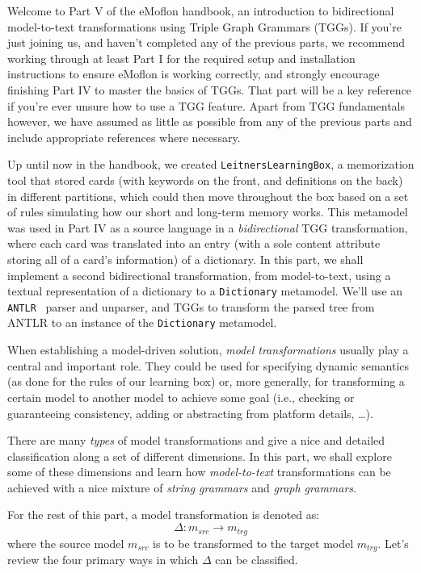 \genHeader

Welcome to Part V of the eMoflon handbook, an introduction to bidirectional model-to-text transformations using Triple Graph Grammars (TGGs). If you're just
joining us, and haven't completed any of the previous parts, we recommend working through at least Part I for the required setup and installation instructions
to ensure eMoflon is working correctly, and strongly encourage finishing Part IV to master the basics of TGGs. That part will be a key reference if you're ever
unsure how to use a TGG feature. Apart from TGG fundamentals however, we have assumed as little as possible from any of the previous parts and
include appropriate references where necessary.

Up until now in the handbook, we created \texttt{LeitnersLearningBox}, a memorization tool that stored cards (with keywords on the front, and definitions on the
back) in different partitions, which could then move throughout the box based on a set of rules simulating how our short and long-term memory works. This
metamodel was used in Part IV as a source language in a \emph{bidirectional}  TGG transformation, where each card was
translated into an entry (with a sole content attribute storing all of a card's information) of a dictionary. In this part, we shall implement a second
bidirectional transformation, from model-to-text, using a textual representation of a dictionary to a \texttt{Dictionary} metamodel.
We'll use an \texttt{ANTLR}~\cite{ANTLR} parser and unparser, and TGGs to transform the parsed tree from ANTLR to an instance of the \texttt{Dictionary}
metamodel.

When establishing a model-driven solution, \emph{model transformations} usually play a central and important role. They could be used for specifying dynamic
semantics (as done for the rules of our learning box) or, more generally, for transforming a certain model to another model to achieve some goal (i.e.,
checking or guaranteeing consistency, adding or abstracting from platform details, \ldots).

There are many \emph{types} of model transformations and \cite{CH03,Mens_Gorp_2006} give a nice and detailed classification along a set of different dimensions.
In this part, we shall explore some of these dimensions and learn how \emph{model-to-text} transformations can be achieved with a nice mixture of \emph{string
grammars} and \emph{graph grammars}.

For the rest of this part, a model transformation is denoted as:
\begin{displaymath}
 	\Delta: m_{src} \rightarrow m_{trg}
\end{displaymath}
where the source model $m_{src}$ is to be transformed to the target model $m_{trg}$. Let's review the four primary ways in which $\Delta$ can be classified.


